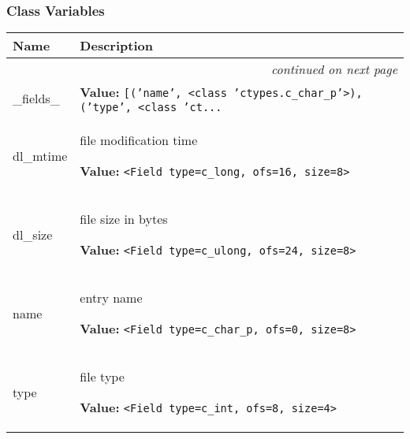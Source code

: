 
  \subsubsection{Class Variables}

    \vspace{-1cm}
\hspace{\varindent}\begin{longtable}{|p{\varnamewidth}|p{\vardescrwidth}|l}
\cline{1-2}
\cline{1-2} \centering \textbf{Name} & \centering \textbf{Description}& \\
\cline{1-2}
\endhead\cline{1-2}\multicolumn{3}{r}{\small\textit{continued on next page}}\\\endfoot\cline{1-2}
\endlastfoot\raggedright \_\-f\-i\-e\-l\-d\-s\-\_\- & \raggedright \textbf{Value:} 
{\tt \texttt{[}\texttt{(}\texttt{'}\texttt{name}\texttt{'}\texttt{, }{\textless}class 'ctypes.c\_char\_p'{\textgreater}\texttt{)}\texttt{, }\texttt{(}\texttt{'}\texttt{type}\texttt{'}\texttt{, }{\textless}class 'ct\texttt{...}}&\\
\cline{1-2}
\raggedright d\-l\-\_\-m\-t\-i\-m\-e\- & \raggedright file modification time

\textbf{Value:} 
{\tt {\textless}Field type=c\_long, ofs=16, size=8{\textgreater}}&\\
\cline{1-2}
\raggedright d\-l\-\_\-s\-i\-z\-e\- & \raggedright file size in bytes

\textbf{Value:} 
{\tt {\textless}Field type=c\_ulong, ofs=24, size=8{\textgreater}}&\\
\cline{1-2}
\raggedright n\-a\-m\-e\- & \raggedright entry name

\textbf{Value:} 
{\tt {\textless}Field type=c\_char\_p, ofs=0, size=8{\textgreater}}&\\
\cline{1-2}
\raggedright t\-y\-p\-e\- & \raggedright file type

\textbf{Value:} 
{\tt {\textless}Field type=c\_int, ofs=8, size=4{\textgreater}}&\\
\cline{1-2}
\end{longtable}



